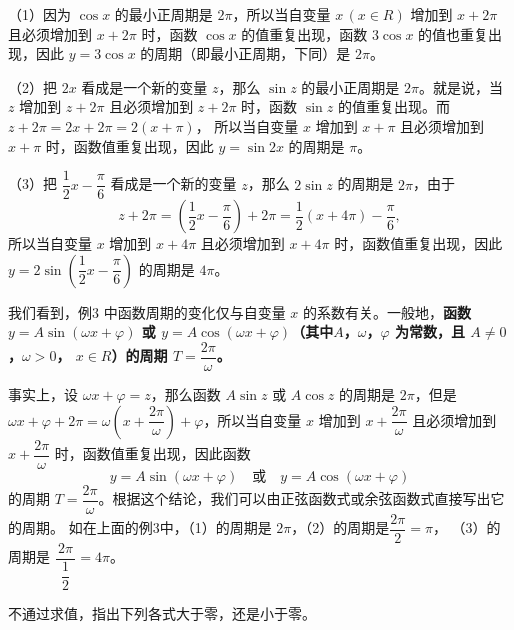 \jie （1）因为 $\cos x$ 的最小正周期是 $2\pi$，所以当自变量 $x \, (x \in R)$ 增加到 $x + 2\pi$
且必须增加到 $x + 2\pi$ 时，函数 $\cos x$ 的值重复出现，函数 $3\cos x$ 的值也重复出现，因此
$y = 3\cos x$ 的周期（即最小正周期，下同）是 $2\pi$。

（2）把 $2x$ 看成是一个新的变量 $z$，那么 $\sin z$ 的最小正周期是 $2\pi$。就是说，当 $z$ 增加到
$z + 2\pi$ 且必须增加到 $z + 2\pi$ 时，函数 $\sin z$ 的值重复出现。而 $z + 2\pi = 2x + 2\pi = 2(x + \pi)$，
所以当自变量 $x$ 增加到 $x + \pi$ 且必须增加到 $x + \pi$ 时，函数值重复出现，因此 $y = \sin 2x$ 的周期是 $\pi$。

（3）把 $\dfrac 1 2 x - \dfrac \pi 6$ 看成是一个新的变量 $z$，那么 $2\sin z$ 的周期是 $2\pi$，由于
$$z + 2\pi = \left( \dfrac 1 2 x - \dfrac \pi 6 \right) + 2\pi = \dfrac 1 2 (x + 4\pi) - \dfrac \pi 6 ,$$
所以当自变量 $x$ 增加到 $x + 4\pi$ 且必须增加到 $x + 4\pi$ 时，函数值重复出现，因此
$y = 2\sin\left( \dfrac 1 2 x - \dfrac \pi 6 \right)$ 的周期是 $4\pi$。

我们看到，例$3$ 中函数周期的变化仅与自变量 $x$ 的系数有关。一般地，\textbf{函数 $y = A \sin(\omega x + \varphi)$
或 $y = A \cos(\omega x + \varphi)$（其中$A$，$\omega$，$\varphi$ 为常数，且 $A \neq 0$，$\omega > 0$，
$x \in R$）的周期 $T = \dfrac{2\pi}{\omega}$。}

事实上，设 $\omega x + \varphi = z$，那么函数 $A \sin z$ 或 $A \cos z$ 的周期是 $2\pi$，但是
$\omega x + \varphi + 2\pi = \omega(x + \dfrac{2\pi}{\omega}) + \varphi$，所以当自变量 $x$
增加到 $x + \dfrac{2\pi}{\omega}$ 且必须增加到 $x + \dfrac{2\pi}{\omega}$ 时，函数值重复出现，因此函数
$$ y = A \sin(\omega x + \varphi) \quad \text{或} \quad y = A \cos(\omega x + \varphi)$$
的周期 $T = \dfrac{2\pi}{\omega}$。根据这个结论，我们可以由正弦函数式或余弦函数式直接写出它的周期。
如在上面的例3中，（1）的周期是 $2\pi$，（2）的周期是$\dfrac{2\pi}{2} = \pi$，
（3）的周期是 $\dfrac{\, 2\pi \,}{\dfrac 1 2} = 4\pi$。

\liti 不通过求值，指出下列各式大于零，还是小于零。
\begin{xiaoxiaotis}

    \vspace{0.5em}

    \vspace{0.5em}

\end{xiaoxiaotis}

